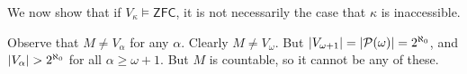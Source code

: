 We now show that if \( V_\kappa \vDash \mathsf{ZFC} \), it is not necessarily the case that \( \kappa \) is inaccessible.

Observe that \( M \neq V_\alpha \) for any \( \alpha \).
Clearly \( M \neq V_\omega \).
But \( \abs{V_{\omega + 1}} = \abs{\mathcal P(\omega)} = 2^{\aleph_0} \), and \( \abs{V_\alpha} > 2^{\aleph_0} \) for all \( \alpha \geq \omega + 1 \).
But \( M \) is countable, so it cannot be any of these.
